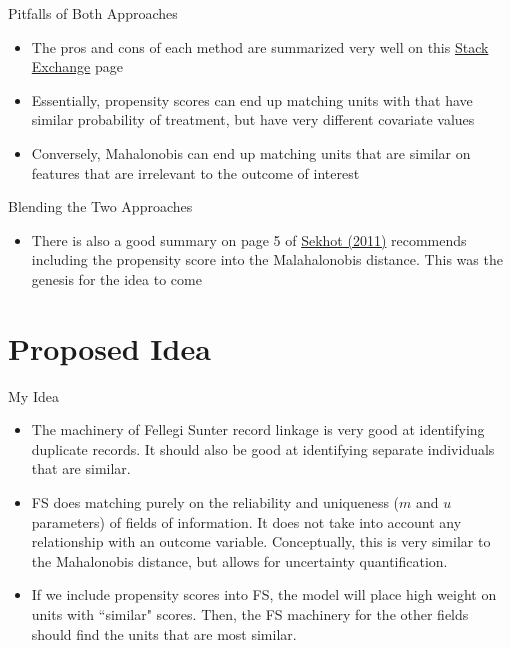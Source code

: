 \documentclass{beamer}
\begin{document}
\begin{frame}{Pitfalls of Both Approaches}
	\begin{itemize}
		\item The pros and cons of each method are summarized very well on this \href{https://stats.stackexchange.com/questions/511294/what-are-the-pros-and-cons-of-using-mahalanobis-distance-instead-of-propensity-s}{Stack Exchange} page

		\item Essentially, propensity scores can end up matching units with that have similar probability of treatment, but have very different covariate values
		\item Conversely, Mahalonobis can end up matching units that are similar on features that are irrelevant to the outcome of interest
	\end{itemize}
\end{frame}

\begin{frame}{Blending the Two Approaches}
	\begin{itemize}
		\item There is also a good summary on page 5 of \href{https://www.jstatsoft.org/article/view/v042i07}{Sekhot (2011)} recommends including the propensity score into the Malahalonobis distance. This was the genesis for the idea to come
	\end{itemize}
\end{frame}

\section{Proposed Idea}

\begin{frame}{My Idea}
	\begin{itemize}
		\item The machinery of Fellegi Sunter record linkage is very good at identifying duplicate records. It should also be good at identifying separate individuals that are similar.
		\item FS does matching purely on the reliability and uniqueness ($m$ and $u$ parameters) of fields of information. It does not take into account any relationship with an outcome variable. Conceptually, this is very similar to the Mahalonobis distance, but allows for uncertainty quantification.
		\item If we include propensity scores into FS, the model will place high weight on units with ``similar" scores. Then, the FS machinery for the other fields should find the units that are most similar. 
	\end{itemize}
\end{frame}
\end{document}
